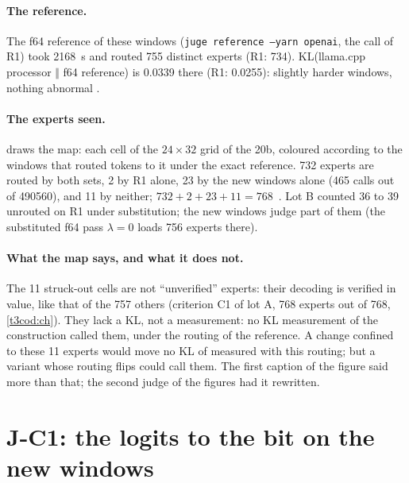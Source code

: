 \paragraph{The reference.} The f64 reference of these windows (\texttt{juge reference --yarn openai}, the call of R1) took \SI{2168}{\second} and routed \num{755} distinct experts (R1: 734). KL(llama.cpp processor $\Vert$ f64 reference) is \num{0.0339} there (R1: \num{0.0255}): slightly harder windows, nothing abnormal \mes.

\paragraph{The experts seen.}  draws the map: each cell of the $24 \times 32$ grid of the 20b, coloured according to the windows that routed tokens to it under the exact reference. 732 experts are routed by both sets, 2 by R1 alone, 23 by the new windows alone (\num{465} calls out of \num{490560}), and 11 by neither; $732 + 2 + 23 + 11 = 768$ \mes\,\calc. Lot B counted 36 to 39 unrouted on R1 under substitution; the new windows judge part of them (the substituted f64 pass $\lambda = 0$ loads 756 experts there).

\begin{figure}[tbp]
\centering
\GrapheJconsExperts
{}
\label{fig:t3-jcons-experts}
\end{figure}

\paragraph{What the map says, and what it does not.} The 11 struck-out cells are not ``unverified'' experts: their decoding is verified in value, like that of the 757 others (criterion C1 of lot A, 768 experts out of 768, \cref{t3cod:ch}). They lack a KL, not a measurement: no KL measurement of the construction called them, under the routing of the reference. A change confined to these 11 experts would move no KL of  measured with this routing; but a variant whose routing flips could call them. The first caption of the figure said more than that; the second judge of the figures had it rewritten.

\section{J-C1: the logits to the bit on the new windows}\label{t3jug:sec:jc1}

